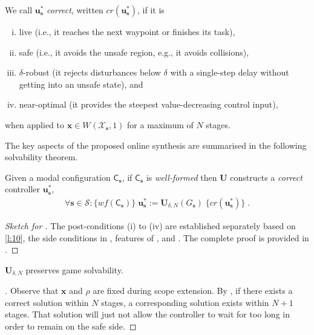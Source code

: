 \documentclass{article}
\renewcommand\vec[1]{\mathbf{#1}}
\newcommand\mDpbDSN[1][]{W^{#1}}
\begin{document}
{We call ${\vec{u}}^*_{\vec{s}}$ \emph{correct}, written
$\mathit{cr}({\vec{u}}^*_{\vec{s}})$, if it is
\begin{enumerate}[(i)]
\item live (i.e., it reaches the next waypoint or finishes its task),
\item safe (i.e., it avoids the unsafe region, e.g., it avoids collisions),
\item $\delta$-robust (it rejects disturbances
  below $\delta$ with a single-step delay without getting into an
  unsafe state), and
\item near-optimal (it provides the steepest value-decreasing control input),
\end{enumerate}
when applied to ${\vec{x}}\in\mDpbDSN(\mathcal{X}_{\vec{s}},1)$
for a maximum of $N$ stages.

The key aspects of the proposed online synthesis are summarised in the
following solvability theorem.

\begin{theorem}
  \label{l:24}
  Given a modal configuration $\mathsf{C}_{\vec{s}}$, if
  $\mathsf{C}_{\vec{s}}$ is \emph{well-formed} then
  $\vec{U}$ 
  constructs 
  a \emph{correct} controller ${\vec{u}}^*_{\vec{s}}$,
  \begin{align*}
    \forall{\vec{s}}\in{\mathcal{S}}\colon
    \{\mathit{wf}(\mathsf{C}_{\vec{s}})\}\;
    {\vec{u}}^*_{\vec{s}} :=
    \vec{U}_{\delta,N}(G_{\vec{s}})\;
    \{\mathit{cr}({\vec{u}}^*_{\vec{s}})\}\;.
  \end{align*}
\end{theorem}

\begin{proof}[Sketch for ]
  The post-conditions (i) to (iv) are established separately based on
  \eqref{l:10}, the side conditions in
  , features of ,
  and .  The complete proof is
  provided in .
\end{proof}

\begin{lemma}[Preservation]
  \label{l:25}
  $\vec{U}_{\delta,N}$
  preserves game solvability.
\end{lemma}

\begin{proof}[]
  Observe that ${\vec{x}}$ and $\rho$ are fixed during scope
  extension.  By , if there exists a correct
  solution within $N$ stages, a corresponding solution exists
  within $N+1$ stages.  That solution will just not allow the
  controller to wait for too long in order to remain on the safe side.


\end{proof}}
\end{document}
